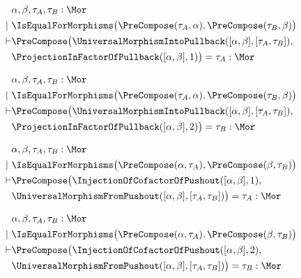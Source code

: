 \begin{sequent}
\begin{align*}
  &\alpha, \beta, \tau_A, \tau_B:\Mor \\
  |~ &\IsEqualForMorphisms\big( \PreCompose( \tau_A, \alpha ), \PreCompose( \tau_B, \beta ) \big)\\
  \vdash &\PreCompose\big( \UniversalMorphismIntoPullback( [\alpha, \beta], [\tau_A, \tau_B] ), \\
  &\ProjectionInFactorOfPullback( [\alpha, \beta], 1 ) \big) = \tau_A: \Mor
\end{align*}
\end{sequent}

\begin{sequent}
\begin{align*}
  &\alpha, \beta, \tau_A, \tau_B:\Mor \\
  |~ &\IsEqualForMorphisms\big( \PreCompose( \tau_A, \alpha ), \PreCompose( \tau_B, \beta ) \big)\\
  \vdash &\PreCompose\big( \UniversalMorphismIntoPullback( [\alpha, \beta], [\tau_A, \tau_B] ), \\
  &\ProjectionInFactorOfPullback( [\alpha, \beta], 2 ) \big) = \tau_B: \Mor
\end{align*}
\end{sequent}

\begin{sequent}
\begin{align*}
  &\alpha, \beta, \tau_A, \tau_B:\Mor \\
  |~ &\IsEqualForMorphisms\big( \PreCompose( \alpha, \tau_A ), \PreCompose( \beta, \tau_B) \big)\\
  \vdash &\PreCompose\big( \InjectionOfCofactorOfPushout( [\alpha, \beta], 1 ), \\
  &\UniversalMorphismFromPushout( [\alpha, \beta], [\tau_A, \tau_B] )\big) = \tau_A: \Mor
\end{align*}
\end{sequent}

\begin{sequent}
\begin{align*}
  &\alpha, \beta, \tau_A, \tau_B:\Mor \\
  |~ &\IsEqualForMorphisms\big( \PreCompose( \alpha, \tau_A ), \PreCompose( \beta, \tau_B) \big)\\
  \vdash &\PreCompose\big( \InjectionOfCofactorOfPushout( [\alpha, \beta], 2 ), \\
  &\UniversalMorphismFromPushout( [\alpha, \beta], [\tau_A, \tau_B] )\big) = \tau_B: \Mor
\end{align*}
\end{sequent}
